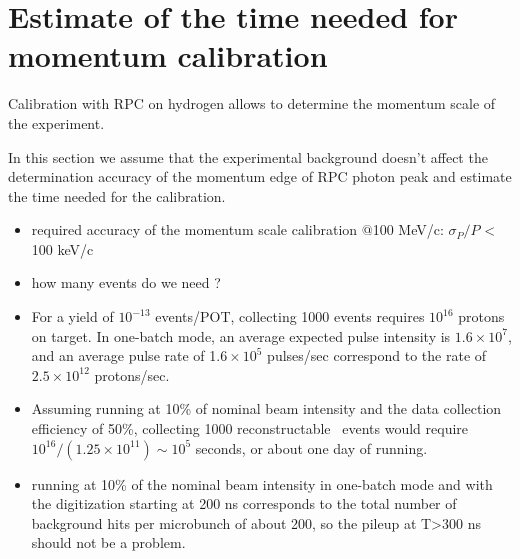 \section{Estimate of the time needed for momentum calibration}
Calibration with RPC on hydrogen allows to determine the momentum scale of the experiment.

In this section we assume that the experimental background doesn't affect
the determination accuracy of the momentum edge of RPC photon peak
and estimate the time needed for the calibration.

\begin{itemize}
\item 
  required accuracy of the momentum scale calibration $@$100 MeV/c: $\sigma_P/P$ < 100 keV/c
\item
  {\red how many events do we need ?}
\item
  For a yield of $10^{-13}$ events/POT, collecting 1000 events requires $10^{16}$ protons on target.
  In one-batch mode, an average expected pulse intensity is $1.6 \times 10^7$, and
  an average  pulse rate of 1$.6 \times 10^5$ pulses/sec correspond to the rate of $2.5 \times 10^{12}$ protons/sec.
\item
  Assuming running at 10\% of nominal beam intensity and the data collection efficiency of 50\%,
  collecting 1000 reconstructable \piplusenu\ events would require
  $10^{16}/(1.25 \times 10^{11}) \sim 10^5$ seconds, or about one day of running.
\item
  running at 10\% of the nominal beam intensity in one-batch mode and with the digitization starting
  at 200 ns corresponds to the total number of background hits per microbunch of about 200,
  so the pileup at T>300 ns should not be a problem.
\end{itemize}

